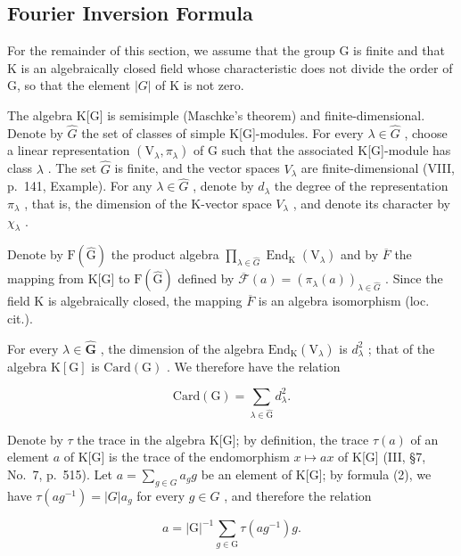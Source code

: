 \subsection{Fourier Inversion Formula}

For the remainder of this section, we assume that the group G is finite and that K is an algebraically closed field whose characteristic does not divide the order of G, so that the element \(|G|\) of K is not zero.

The algebra K{[}G{]} is semisimple (Maschke's theorem) and finite-dimensional. Denote by \(\widehat{G}\) the set of classes of simple K{[}G{]}-modules. For every \(\lambda\in\widehat{G}\) , choose a linear representation \((\mathrm{V}_{\lambda},\pi_{\lambda})\) of G such that the associated K{[}G{]}-module has class \(\lambda\) . The set \(\widehat{G}\) is finite, and the vector spaces \(V_{\lambda}\) are finite-dimensional (VIII, p.~141, Example). For any \(\lambda\in\widehat{G}\) , denote by \(d_{\lambda}\) the degree of the representation \(\pi_{\lambda}\) , that is, the dimension of the K-vector space \(V_{\lambda}\) , and denote its character by \(\chi_{\lambda}\) .

Denote by \(\mathrm{F}(\widehat{\mathrm{G}})\) the product algebra \(\prod_{\lambda\in\widehat{G}}\operatorname{End}_{\mathrm{K}}(\mathrm{V}_{\lambda})\) and by \(\overline{F}\) the mapping from K{[}G{]} to \(\mathrm{F}(\widehat{\mathrm{G}})\) defined by \(\overline{\mathcal{F}}(a)=(\pi_{\lambda}(a))_{\lambda\in\widehat{G}}\) . Since the field K is algebraically closed, the mapping \(\overline{F}\) is an algebra isomorphism (loc. cit.).

For every \(\lambda \in \widehat{\mathbf{G}}\) , the dimension of the algebra \(\mathrm{End}_{\mathrm{K}}(\mathrm{V}_{\lambda})\) is \(d_{\lambda}^{2}\) ; that of the algebra \(\mathrm{K}[\mathrm{G}]\) is \(\mathrm{Card}(\mathrm{G})\) . We therefore have the relation

\[
\mathrm{Card(G)} = \sum_ {\lambda \in \widehat {\mathrm{G}}} d _ {\lambda} ^ {2}.\tag{8}
\]

Denote by \(\tau\) the trace in the algebra K{[}G{]}; by definition, the trace \(\tau(a)\) of an element \(a\) of K{[}G{]} is the trace of the endomorphism \(x \mapsto ax\) of K{[}G{]} (III, §7, No.~7, p.~515). Let \(a = \sum_{g \in G} a_g g\) be an element of K{[}G{]}; by formula (2), we have \(\tau(ag^{-1}) = |G| a_g\) for every \(g \in G\) , and therefore the relation

\[
a = | \mathrm{G} | ^ {- 1} \sum_ {g \in \mathrm{G}} \tau (a g ^ {- 1}) g.\tag{9}
\]

